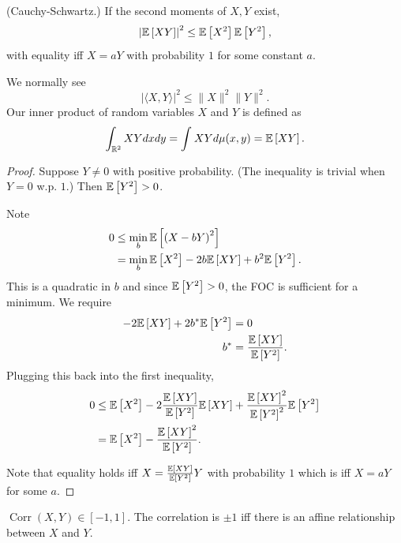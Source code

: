 \begin{theorem}	(Cauchy-Schwartz.) If the second moments of $X,Y$ exist, \[
		\left| \mathbb{E}\left[XY\right]  \right|^2 \le \mathbb{E}\left[X^2\right] \mathbb{E}\left[Y^2\right]
		,\] with equality iff $X = aY$ with probability $1$ for some constant $a$.

	We normally see \[
		\left| \langle X,Y \rangle \right|^2 \le \|X\|^2 \|Y\|^2
		.\] Our inner product of random variables $X$ and $Y$ is defined as \[
		\int_{\mathbb{R}^2}^{} XY dx dy = \int_{}^{} XY d\mu(x,y) = \mathbb{E}\left[XY\right]
		.\]
\end{theorem}

\begin{proof}
	Suppose $Y \ne 0$ with positive probability. (The inequality is trivial when $Y=0$ w.p. $1$.) Then $\mathbb{E}\left[Y^2\right] > 0$.

	Note
	\begin{align*}
		0 & \le \min_b \mathbb{E}\left[\left( X-bY \right)^2\right]                             \\
		  & = \min_b \mathbb{E}\left[X^2\right] - 2b \mathbb{E}\left[XY\right] + b^2 \mathbb{E}\left[Y^2\right]
		.\end{align*}
	This is a quadratic in $b$ and since $\mathbb{E}\left[Y^2\right] > 0$, the FOC is sufficient for a minimum.
	We require
	\begin{align*}
		-2 \mathbb{E}\left[XY\right] + 2b^* \mathbb{E}\left[Y^2\right] & = 0                                              \\
		b^*                                            & = \frac{\mathbb{E}\left[XY\right] }{\mathbb{E}\left[Y^2\right] }
		.\end{align*}
	Plugging this back into the first inequality,
	\begin{align*}
		0 & \le \mathbb{E}\left[X^2\right] - 2 \frac{\mathbb{E}\left[XY\right] }{\mathbb{E}\left[Y^2\right] }\mathbb{E}\left[XY\right] + \frac{\mathbb{E}\left[XY\right] ^2}{\mathbb{E}\left[Y^2\right] ^2}\mathbb{E}\left[Y^2\right] \\
		  & = \mathbb{E}\left[X^2\right] - \frac{\mathbb{E}\left[XY\right] ^2}{\mathbb{E}\left[Y^2\right]}
		.\end{align*}

	Note that equality holds iff $X = \frac{\mathbb{E}\left[XY\right] }{\mathbb{E}\left[Y^2\right] }Y$ with probability $1$ which is iff $X = aY$ for some $a$.
\end{proof}

\begin{proposition}	$\operatorname{Corr}\left(X,Y\right) \in [-1,1]$. The correlation is $\pm 1$ iff there is an affine relationship between $X$ and $Y$.
\end{proposition}

